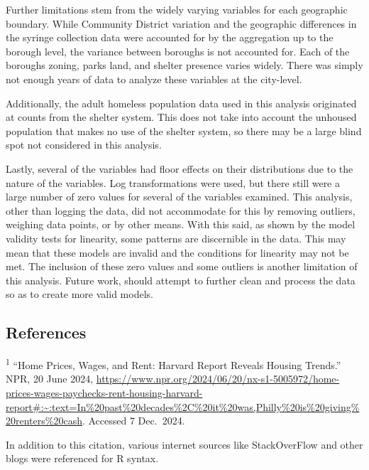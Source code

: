 \documentclass[
]{article}
\begin{document}
Further limitations stem from the widely varying variables for each
geographic boundary. While Community District variation and the
geographic differences in the syringe collection data were accounted for
by the aggregation up to the borough level, the variance between
boroughs is not accounted for. Each of the boroughs zoning, parks land,
and shelter presence varies widely. There was simply not enough years of
data to analyze these variables at the city-level.

Additionally, the adult homeless population data used in this analysis
originated at counts from the shelter system. This does not take into
account the unhoused population that makes no use of the shelter system,
so there may be a large blind spot not considered in this analysis.

Lastly, several of the variables had floor effects on their
distributions due to the nature of the variables. Log transformations
were used, but there still were a large number of zero values for
several of the variables examined. This analysis, other than logging the
data, did not accommodate for this by removing outliers, weighing data
points, or by other means. With this said, as shown by the model
validity tests for linearity, some patterns are discernible in the data.
This may mean that these models are invalid and the conditions for
linearity may not be met. The inclusion of these zero values and some
outliers is another limitation of this analysis. Future work, should
attempt to further clean and process the data so as to create more valid
models.

\subsection{References}\label{references}

\textsuperscript{1} ``Home Prices, Wages, and Rent: Harvard Report
Reveals Housing Trends.'' NPR, 20 June 2024,
\href{}{https://www.npr.org/2024/06/20/nx-s1-5005972/home-prices-wages-paychecks-rent-housing-harvard-report\#:\textasciitilde:text=In\%20past\%20decades\%2C\%20it\%20was,Philly\%20is\%20giving\%20renters\%20cash}.
Accessed 7 Dec.~2024.

In addition to this citation, various internet sources like
StackOverFlow and other blogs were referenced for R syntax.
\end{document}
